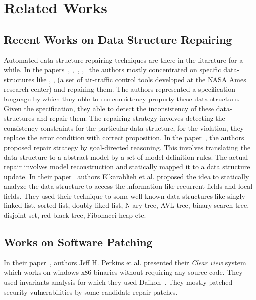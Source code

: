 

\chapter{Related Works}
\label{chapter:relatedWorks}

\section{Recent Works on Data Structure Repairing}
\label{sec:RecWorksDataStructure}

Automated data-structure repairing techniques are there in the litarature for a
while. In the papers~\cite{conf/oopsla/DemskyR03},
\cite{Demsky03automaticdata},~\cite{conf/icse/DemskyR05},
\cite{conf/issre/DemskyR03},~\cite{conf/issta/DemskyEGMPR06} the
authors mostly concentrated on specific data-structures like ,
,  (a set of air-traffic control tools developed at the
NASA Ames research center) and repairing them. The authors represented a
specification language by which they able to see consistency property these
data-structure. Given the specification, they able to detect the inconsistency
of these data-structures and repair them.
The repairing strategy involves detecting the consistency constraints for the
particular data structure, for the violation, they replace the error condition
with correct proposition. In the paper~\cite{conf/icse/DemskyR05}, the
authors proposed repair strategy by goal-directed reasoning. This involves
translating the data-structure to a abstract model by a set of model definition
rules. The actual repair involves model reconstruction and statically mapped it
to a data structure update. In their paper~\cite{conf/oopsla/2007} authors
Elkarablieh et al. proposed the idea to statically analyze the data structure to
access the information like recurrent fields and local fields. They used their
technique to some well known data structures like singly linked list, sorted
list, doubly liked list, N-ary tree, AVL tree, binary search tree, disjoint set,
red-black tree, Fibonacci heap etc.

\section{Works on Software Patching}
\label{sec:RecWorksSoftPatch}

In their paper~\cite{conf/sosp/PerkinsKLABCPSSSWZER09}, authors Jeff H.
Perkins et al. presented their \emph{Clear view} system which works on windows
x86 binaries without requiring any source code. They used invariants analysis for
which they used Daikon~\cite{DBLP:journals/scp/ErnstPGMPTX07}. They mostly
patched security vulnerabilities by some candidate repair patches.

